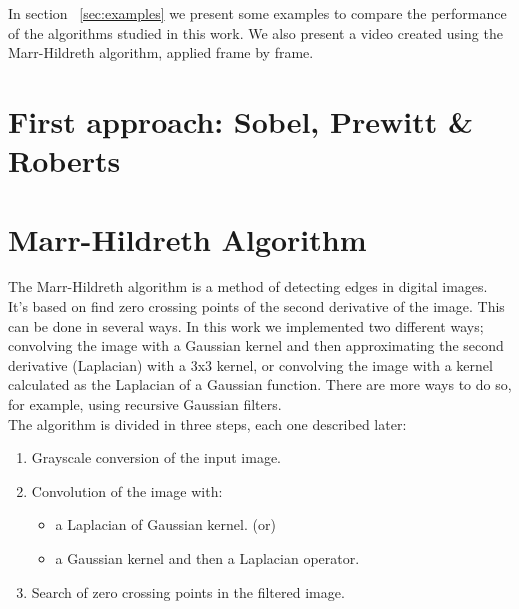 \documentclass{ipol}
\begin{document}
In section ~\ref{sec:examples} we present some examples to compare the 
performance of the algorithms studied in this work. We also present a 
video created using the Marr-Hildreth algorithm, applied frame by frame.\\

\section{First approach: Sobel, Prewitt \& Roberts}
\label{sec:sobel}

\section{Marr-Hildreth Algorithm}
\label{sec:mh}

The Marr-Hildreth algorithm is a method of detecting edges in digital 
images. It's based on find zero crossing points of the second derivative
of the image. This can be done in several ways. In this work we implemented 
two different ways; convolving the image with a Gaussian kernel and then 
approximating the second derivative (Laplacian) with a 3x3 kernel, or 
convolving the image with a kernel calculated as the Laplacian of a 
Gaussian function. There are more ways to do so, for example, using 
recursive Gaussian filters.\\


The algorithm is divided in three steps, each one described later:
\begin{enumerate}
	\item Grayscale conversion of the input image.
	\item Convolution of the image with:
	\begin{itemize}
		\item a Laplacian of Gaussian kernel. (or)
		\item a Gaussian kernel and then a Laplacian operator.
	\end{itemize}
	\item Search of zero crossing points in the filtered image.\\
\end{enumerate}
\end{document}
